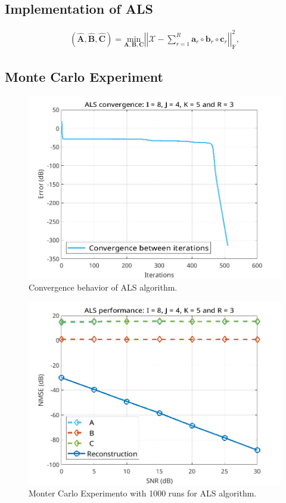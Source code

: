 \documentclass[a4paper,10pt]{article}
\begin{document}
    \subsection*{Implementation of ALS}

    \begin{align}
        \left(\hat{\boldsymbol{A}}, \hat{\boldsymbol{B}}, \hat{\boldsymbol{C}}\right) = \underset{\boldsymbol{A}, \boldsymbol{B}, \boldsymbol{C}}{\text{min}} \left| \left| \mathcal{X} - \sum^{R}_{r = 1} \boldsymbol{a}_{r} \circ \boldsymbol{b}_{r} \circ \boldsymbol{c}_{r} \right| \right|^{2}_{\text{F}},
    \end{align}

    \subsection*{Monte Carlo Experiment}

    \begin{figure}[ht!]
        \centering 
        \includegraphics[width=0.75\linewidth]{figs/hw11a1.png} \par 
        \caption{Convergence behavior of ALS algorithm.}
        \label{fig:hw11a1} 
    \end{figure}

    \begin{figure}[ht!]
        \centering 
        \includegraphics[width=0.75\linewidth]{figs/hw11a2.png} \par 
        \caption{Monter Carlo Experimento with 1000 runs for ALS algorithm.}
        \label{fig:hw11a2} 
    \end{figure}
\end{document}
